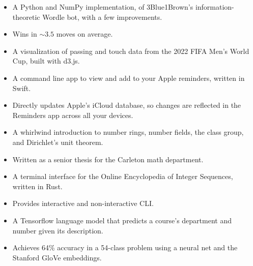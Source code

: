 \documentclass{resume}
\begin{document}

\begin{itemize}
	\item A Python and NumPy implementation, of 3Blue1Brown's information-theoretic Wordle bot, with a few improvements.
	\item Wins in $\sim 3.5$ moves on average.
\end{itemize}


\begin{itemize}
	\item A visualization of passing and touch data from the 2022 FIFA Men's World Cup, built with d3.js.
\end{itemize}


\begin{itemize}
	\item A command line app to view and add to your Apple reminders, written in Swift.
	\item Directly updates Apple's iCloud database, so changes are reflected in the Reminders app across all your devices.
\end{itemize}


\begin{itemize}
	\item A whirlwind introduction to number rings, number fields, the class group, and Dirichlet's unit theorem.
	\item Written as a senior thesis for the Carleton math department.
\end{itemize}


\begin{itemize}
	\item A terminal interface for the Online Encyclopedia of Integer Sequences, written in Rust.
	\item Provides interactive and non-interactive CLI.
\end{itemize}


\begin{itemize}
	\item A Tensorflow language model that predicts a course's department and number given its description.
	\item Achieves 64\% accuracy in a 54-class problem using a neural net and the Stanford GloVe embeddings.
\end{itemize}
\end{document}
